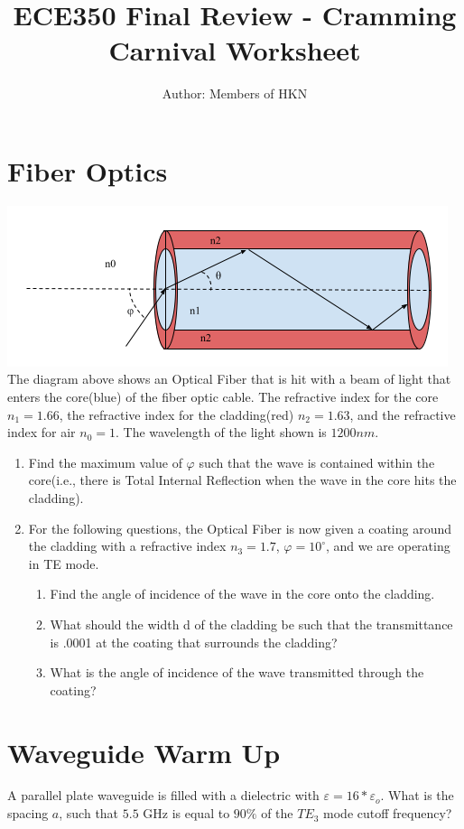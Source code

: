 \documentclass{article}
\title{ECE350 Final Review - Cramming Carnival Worksheet}
\author{Author: Members of HKN}
\date{}
\begin{document}
\maketitle

\section{Fiber Optics}
\includegraphics{figures/Optical Fiber Diagram.png}
The diagram above shows an Optical Fiber that is hit with a beam of light that enters the core(blue) of the fiber optic cable. The refractive index for the core $n_{1}=1.66$, the refractive index for the cladding(red) $n_{2}=1.63$, and the refractive index for air $n_{0}=1$. The wavelength of the light shown is $1200 nm$.

\begin{enumerate}[label=(\alph*)]
    \item {Find the maximum value of $\varphi$ such that the wave is contained within the core(i.e., there is Total Internal Reflection when the wave in the core hits the cladding).}
    
    \item {For the following questions, the Optical Fiber is now given a coating around the cladding with a refractive index $n_{3}=1.7$, $\varphi=10^{\circ}$, and we are operating in TE mode.}
    \begin{enumerate}[label=(\roman*)]
        \item {Find the angle of incidence of the wave in the core onto the cladding.}
        \item { What should the width d of the cladding be such that the transmittance is .0001 at the coating that surrounds the cladding?}
        \item {What is the angle of incidence of the wave transmitted through the coating?}
    \end{enumerate}
\end{enumerate}

\section{Waveguide Warm Up}
A parallel plate waveguide is filled with a dielectric with $\varepsilon=16*\varepsilon_{o}$. What is the spacing $a$, such that $5.5$ GHz is equal to $90\%$ of the $TE_{3}$ mode cutoff frequency?
\end{document}
